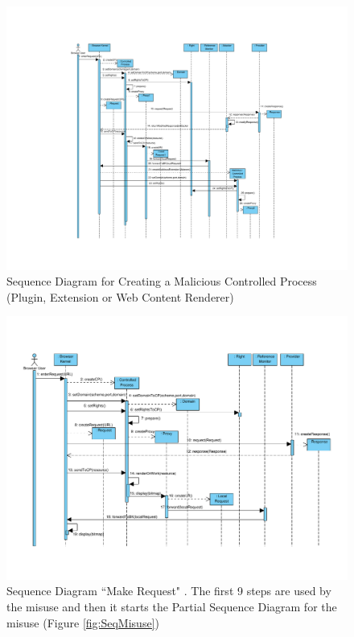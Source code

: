 \documentclass{sig-alternate-05-2015}
\begin{document}
\begin{figure}[h!t]
\vspace*{-2.5cm}
  \centering
  \hspace*{-4cm}\includegraphics[scale=0.9]{figures/misuse/MakeRequestMisuse_installMalicious.pdf}
  \vspace*{-2cm}
  \caption{Sequence Diagram for Creating a Malicious Controlled Process (Plugin, Extension or Web Content Renderer)}
  \label{fig:SeqInstall}
\end{figure}

\begin{figure}[h!t]
\vspace*{-2cm}
  \centering
  \includegraphics[scale=0.65]{figures/BI/MakeRequest-v3_original.pdf}
  \vspace*{-2cm}
  \caption{Sequence Diagram ``Make Request" \cite{silva2015}. The first 9 steps are used by the misuse and then it starts the Partial Sequence Diagram for the misuse (Figure \ref{fig:SeqMisuse})}
  \label{fig:SeqMakeReq}
\end{figure}
\end{document}
